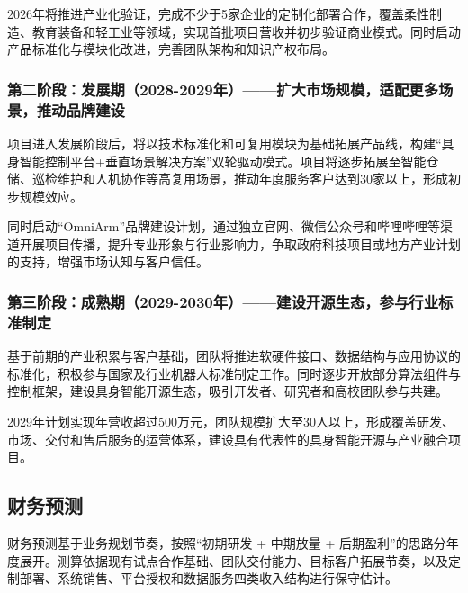 \documentclass[zihao=-4]{ctexart}
\begin{document}
2026年将推进产业化验证，完成不少于5家企业的定制化部署合作，覆盖柔性制造、教育装备和轻工业等领域，实现首批项目营收并初步验证商业模式。同时启动产品标准化与模块化改进，完善团队架构和知识产权布局。

\subsubsection{第二阶段：发展期（2028-2029年）——扩大市场规模，适配更多场景，推动品牌建设}

项目进入发展阶段后，将以技术标准化和可复用模块为基础拓展产品线，构建“具身智能控制平台+垂直场景解决方案”双轮驱动模式。项目将逐步拓展至智能仓储、巡检维护和人机协作等高复用场景，推动年度服务客户达到30家以上，形成初步规模效应。

同时启动“OmniArm”品牌建设计划，通过独立官网、微信公众号和哔哩哔哩等渠道开展项目传播，提升专业形象与行业影响力，争取政府科技项目或地方产业计划的支持，增强市场认知与客户信任。

\subsubsection{第三阶段：成熟期（2029-2030年）——建设开源生态，参与行业标准制定}

基于前期的产业积累与客户基础，团队将推进软硬件接口、数据结构与应用协议的标准化，积极参与国家及行业机器人标准制定工作。同时逐步开放部分算法组件与控制框架，建设具身智能开源生态，吸引开发者、研究者和高校团队参与共建。

2029年计划实现年营收超过500万元，团队规模扩大至30人以上，形成覆盖研发、市场、交付和售后服务的运营体系，建设具有代表性的具身智能开源与产业融合项目。

\subsection{财务预测}

财务预测基于业务规划节奏，按照“初期研发 + 中期放量 + 后期盈利”的思路分年度展开。测算依据现有试点合作基础、团队交付能力、目标客户拓展节奏，以及定制部署、系统销售、平台授权和数据服务四类收入结构进行保守估计。
\end{document}
